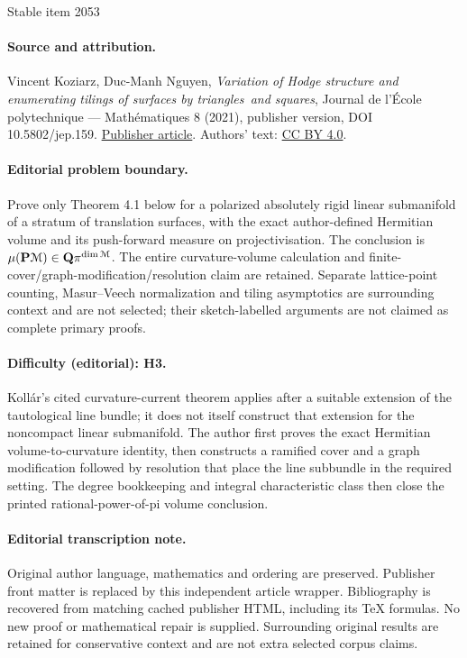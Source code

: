 \documentclass[11pt]{article}
\numberwithin{equation}{section}
\let\mathcal\EuScript
\theoremstyle{plain}
\theoremstyle{definition}
\begin{document}
\begin{center}{\Large Stable item 2053}\end{center}
\paragraph{Source and attribution.}
Vincent Koziarz, Duc-Manh Nguyen, \emph{Variation of Hodge structure and enumerating tilings of surfaces by triangles and squares}, Journal de l’École polytechnique — Mathématiques 8 (2021), publisher version, DOI 10.5802/jep.159. \href{https://jep.centre-mersenne.org/articles/10.5802/jep.159/}{Publisher article}. Authors' text: \href{https://creativecommons.org/licenses/by/4.0/}{CC BY 4.0}.
\paragraph{Editorial problem boundary.}
Prove only Theorem 4.1 below for a polarized absolutely rigid linear submanifold of a stratum of translation surfaces, with the exact author-defined Hermitian volume and its push-forward measure on projectivisation. The conclusion is \(\mu(\mathbf P\mathcal M)\in\mathbf Q\pi^{\dim\mathcal M}\). The entire curvature-volume calculation and finite-cover/graph-modification/resolution claim are retained. Separate lattice-point counting, Masur--Veech normalization and tiling asymptotics are surrounding context and are not selected; their sketch-labelled arguments are not claimed as complete primary proofs.
\paragraph{Difficulty (editorial): H3.}
Kollár's cited curvature-current theorem applies after a suitable extension of the tautological line bundle; it does not itself construct that extension for the noncompact linear submanifold. The author first proves the exact Hermitian volume-to-curvature identity, then constructs a ramified cover and a graph modification followed by resolution that place the line subbundle in the required setting. The degree bookkeeping and integral characteristic class then close the printed rational-power-of-pi volume conclusion.
\paragraph{Editorial transcription note.}
Original author language, mathematics and ordering are preserved. Publisher front matter is replaced by this independent article wrapper. Bibliography is recovered from matching cached publisher HTML, including its TeX formulas. No new proof or mathematical repair is supplied. Surrounding original results are retained for conservative context and are not extra selected corpus claims.
\clearpage
\end{document}
